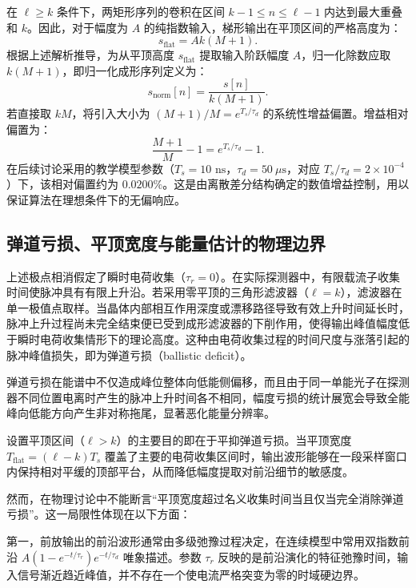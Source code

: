 在 $\ell \ge k$ 条件下，两矩形序列的卷积在区间 $k - 1 \le n \le \ell - 1$ 内达到最大重叠和 $k$。因此，对于幅度为 $A$ 的纯指数输入，梯形输出在平顶区间的严格高度为：
\begin{equation}\label{eq:5-3-sflat}
s_{\text{flat}} = A k (M + 1).
\end{equation}
根据上述解析推导，为从平顶高度 $s_{\text{flat}}$ 提取输入阶跃幅度 $A$，归一化除数应取 $k (M + 1)$，即归一化成形序列定义为：
\begin{equation}\label{eq:5-3-snorm}
s_{\mathrm{norm}}[n] = \frac{s[n]}{k (M + 1)}.
\end{equation}
若直接取 $k M$，将引入大小为 $(M+1)/M = e^{T_s / \tau_d}$ 的系统性增益偏置。增益相对偏置为：
\begin{equation}\label{eq:5-3-gain-bias}
\frac{M+1}{M} - 1 = e^{T_s/\tau_d} - 1.
\end{equation}
在后续讨论采用的教学模型参数（$T_s = 10\text{ ns}$，$\tau_d = 50\ \mu\text{s}$，对应 $T_s / \tau_d = 2 \times 10^{-4}$）下，该相对偏置约为 $0.0200\%$。这是由离散差分结构确定的数值增益控制，用以保证算法在理想条件下的无偏响应。

\subsection{弹道亏损、平顶宽度与能量估计的物理边界}\label{subsec:5-3-3}

上述极点相消假定了瞬时电荷收集（$\tau_r = 0$）。在实际探测器中，有限载流子收集时间使脉冲具有有限上升沿。若采用零平顶的三角形滤波器（$\ell = k$），滤波器在单一极值点取样。当晶体内部相互作用深度或漂移路径导致有效上升时间延长时，脉冲上升过程尚未完全结束便已受到成形滤波器的下削作用，使得输出峰值幅度低于瞬时电荷收集情形下的理论高度。这种由电荷收集过程的时间尺度与涨落引起的脉冲峰值损失，即为弹道亏损（ballistic deficit）。

弹道亏损在能谱中不仅造成峰位整体向低能侧偏移，而且由于同一单能光子在探测器不同位置电离时产生的脉冲上升时间各不相同，幅度亏损的统计展宽会导致全能峰向低能方向产生非对称拖尾，显著恶化能量分辨率。

设置平顶区间（$\ell > k$）的主要目的即在于平抑弹道亏损。当平顶宽度 $T_{\text{flat}} = (\ell - k) T_s$ 覆盖了主要的电荷收集区间时，输出波形能够在一段采样窗口内保持相对平缓的顶部平台，从而降低幅度提取对前沿细节的敏感度。

然而，在物理讨论中不能断言“平顶宽度超过名义收集时间当且仅当完全消除弹道亏损”。这一局限性体现在以下方面：

第一，前放输出的前沿波形通常由多级弛豫过程决定，在连续模型中常用双指数前沿 $A (1 - e^{-t/\tau_r}) e^{-t/\tau_d}$ 唯象描述。参数 $\tau_r$ 反映的是前沿演化的特征弛豫时间，输入信号渐近趋近峰值，并不存在一个使电流严格突变为零的时域硬边界。

